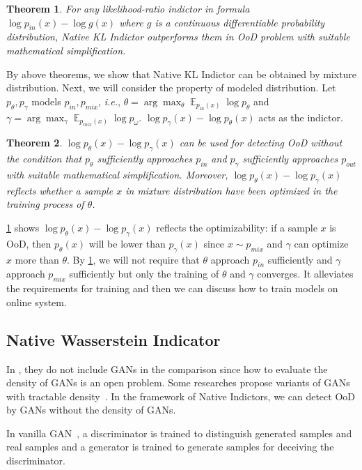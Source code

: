 \documentclass[letterpaper]{article} %
\newtheorem{theorem}{Theorem}
\newcommand{\IE}{\textit{i.e.}, }
\newcommand{\E}{\operatorname{\mathbb{E}}}
\newcommand{\pin}{p_{in}}
\newcommand{\pout}{p_{out}}
\newcommand{\pmix}{p_{mix}}
\begin{document}
\begin{theorem}\label{thm4}
For any likelihood-ratio indictor in formula $\log \pin(x) - \log g(x)$ where $g$ is a continuous differentiable probability distribution, Native KL Indictor outperforms them in OoD problem with suitable mathematical simplification. 
\end{theorem}

By above theorems, we show that Native KL Indictor can be obtained by mixture distribution. Next, we will consider the property of modeled distribution. Let $p_\theta, p_\gamma$ models $\pin, \pmix$, \IE $\theta = \arg \max_\theta \E_{\pin(x)} \log p_\theta$ and $\gamma = \arg \max_\gamma \E_{\pmix(x)} \log p_\omega$. $\log p_\gamma(x) - \log p_\theta(x)$ acts as the indictor. 

\begin{theorem}\label{thm5}
	$\log p_\theta(x) - \log p_\gamma(x)$ can be used for detecting OoD without the condition that $p_\theta$ sufficiently approaches $\pin$ and $p_\gamma$ sufficiently approaches $\pout$ with suitable mathematical simplification. Moreover, $\log p_\theta(x) - \log p_\gamma(x)$ reflects whether a sample $x$ in mixture distribution have been optimized in the training process of $\theta$. 
\end{theorem}

\cref{thm4} shows $\log p_\theta(x) - \log p_\gamma(x)$ reflects the optimizability: if a sample $x$ is OoD, then $p_\theta(x)$ will be lower than $p_\gamma(x)$ since $x \sim \pmix$ and $\gamma$ can optimize $x$ more than $\theta$. By \cref{thm4}, we will not require that $\theta$ approach $\pin$ sufficiently and $\gamma$ approach $\pmix$ sufficiently but only the training of $\theta$ and $\gamma$ converges. It alleviates the requirements for training and then we can discuss how to train models on online system. 

\subsection{Native Wasserstein Indicator}
In \cite{nalisnick2018deep}, they do not include GANs in the comparison since how to evaluate the density of GANs is an open problem. Some researches propose  variants of GANs with tractable density~\cite{kumar2019maximum}. In the framework of Native Indictors, we can detect OoD by GANs without the density of GANs. 

In vanilla GAN~\cite{goodfellow2014generative}, a discriminator is trained to distinguish generated samples and real samples and  a generator is trained to generate samples for deceiving the discriminator.
\end{document}
